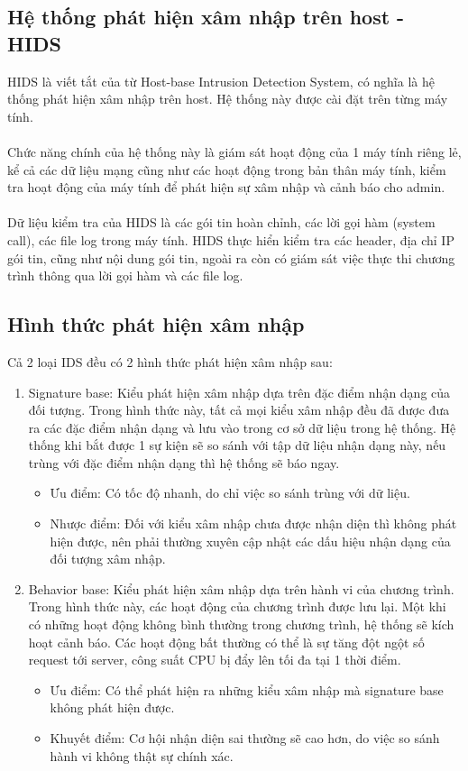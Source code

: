 \subsection{Hệ thống phát hiện xâm nhập trên host - HIDS}
  HIDS là viết tắt của từ Host-base Intrusion Detection System, có nghĩa là hệ
  thống phát hiện xâm nhập trên host. Hệ thống này được cài đặt trên từng máy
  tính.\\\\  
  Chức năng chính của hệ thống này là giám sát hoạt động của 1 máy tính riêng
  lẻ, kể cả các dữ liệu mạng cũng như các hoạt động trong bản thân máy tính,
  kiểm tra hoạt động của máy tính để phát hiện sự xâm nhập và cảnh báo cho
  admin.\\\\ 
  Dữ liệu kiểm tra của HIDS là các gói tin hoàn chỉnh, các lời gọi hàm (system
  call), các file log trong máy tính. HIDS thực hiển kiểm tra các header, địa
  chỉ IP gói tin, cũng như nội dung gói tin, ngoài ra còn có giám sát việc thực
  thi chương trình thông qua lời gọi hàm và các file log.
\subsection{Hình thức phát hiện xâm nhập}
  Cả 2 loại IDS đều có 2 hình thức phát hiện xâm nhập sau:
  \begin{enumerate}
    \item Signature base: Kiểu phát hiện xâm nhập dựa trên đặc điểm nhận dạng
    của đối tượng. Trong hình thức này, tất cả mọi kiểu xâm nhập đều đã được đưa
    ra các đặc điểm nhận dạng và lưu vào trong cơ sở dữ liệu trong hệ thống. Hệ thống khi bắt được 1 sự kiện sẽ so sánh với tập dữ liệu nhận dạng này, nếu trùng với đặc điểm nhận dạng thì hệ thống sẽ báo ngay.
    \begin{itemize}
      \item Ưu điểm: Có tốc độ nhanh, do chỉ việc so sánh trùng với dữ liệu.
      \item Nhược điểm: Đối với kiểu xâm nhập chưa được nhận diện thì không phát
      hiện được, nên phải thường xuyên cập nhật các dấu hiệu nhận dạng của đối tượng xâm nhập.
    \end{itemize}
     
	\item Behavior base: Kiểu phát hiện xâm nhập dựa trên hành vi của chương
	trình. Trong hình thức này, các hoạt động của chương trình được lưu lại. Một
	khi có những hoạt động không bình thường trong chương trình, hệ thống sẽ kích
	hoạt cảnh báo. Các hoạt động bất thường có thể là sự tăng đột ngột số request
	tới server, công suất CPU bị đẩy lên tối đa tại 1 thời điểm.
	 \begin{itemize}
	   \item Ưu điểm: Có thể phát hiện ra những kiểu xâm nhập mà signature base không phát
	 hiện được.
	 \item Khuyết điểm: Cơ hội nhận diện sai thường sẽ cao hơn, do việc so sánh hành vi
	không thật sự chính xác.
	\end{itemize}
  \end{enumerate}
